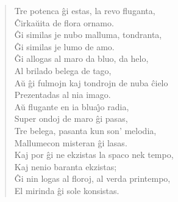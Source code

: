 \begin{verse}
               Tre potenca \^gi estas, la revo fluganta,\\
               \^Cirka\u uita de flora ornamo.\\
               \^Gi similas je nubo malluma, tondranta,\\
               \^Gi similas je lumo de amo.\\
               \^Gi allogas al maro da bluo, da helo,\\
               Al brilado belega de tago,\\
               A\u u \^gi fulmojn kaj tondrojn de nuba \^cielo\\
               Prezentadas al nia imago.\\
               A\u u flugante en ia blua\^{\j}o radia,\\
               Super ondoj de maro \^gi pasas,\\
               Tre belega, pasanta kun son' melodia,\\
               Mallumecon misteran \^gi lasas.\\
               Kaj por \^gi ne ekzistas la spaco nek tempo,\\
               Kaj nenio baranta ekzistas;\\
               \^Gi nin logas al floroj, al verda printempo,\\
               El mirinda \^gi sole konsistas.

\end{verse}

\smallrule{}